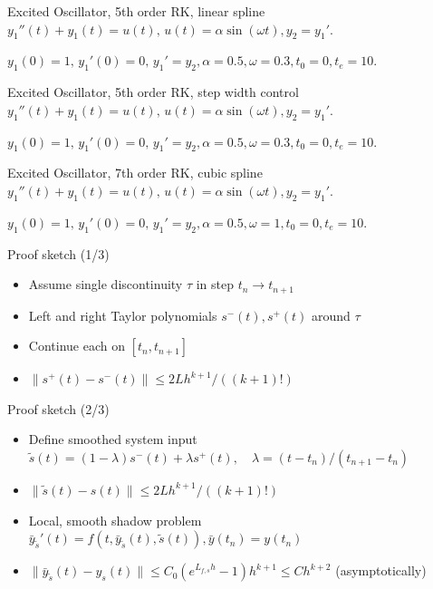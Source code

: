 \documentclass{beamer}
\newcommand{\nologo}{\setbeamertemplate{logo}{}}
\begin{document}
\begin{frame}{Excited Oscillator, 5th order RK, linear spline}
  $y_{1}''(t) + y_{1}(t) = u(t),\, u(t) = \alpha\sin(\omega t), y_{2} = y_{1}'$.
  
  $y_{1}(0) = 1,\, y_{1}'(0) = 0,\, y_{1}' = y_{2}, \alpha = 0.5, \omega = 0.3, t_{0} = 0, t_{e} = 10$.
\end{frame}

\begin{frame}{Excited Oscillator, 5th order RK, step width control}
  $y_{1}''(t) + y_{1}(t) = u(t),\, u(t) = \alpha\sin(\omega t), y_{2} = y_{1}'$.
  
  $y_{1}(0) = 1,\, y_{1}'(0) = 0,\, y_{1}' = y_{2}, \alpha = 0.5, \omega = 0.3, t_{0} = 0, t_{e} = 10$.
\end{frame}

\begin{frame}{Excited Oscillator, 7th order RK, cubic spline}
  $y_{1}''(t) + y_{1}(t) = u(t),\, u(t) = \alpha\sin(\omega t), y_{2} = y_{1}'$.
  
  $y_{1}(0) = 1,\, y_{1}'(0) = 0,\, y_{1}' = y_{2}, \alpha = 0.5, \omega = 1, t_{0} = 0, t_{e} = 10$.
\end{frame}

\begin{frame}{Proof sketch (1/3)}
  
  \begin{itemize}
    \item<1-> Assume single discontinuity $\tau$ in step $t_{n} \to t_{n+1}$
    \item<2-> Left and right Taylor polynomials $s^{-}(t), s^{+}(t)$ around $\tau$
    \item<3-> Continue each on $[t_{n}, t_{n+1}]$
    \item<4-> $\lVert s^{+}(t) - s^{-}(t) \rVert \leq 2Lh^{k+1} / ((k+1)!)$
  \end{itemize}
\end{frame}

{
  \nologo
  \begin{frame}{Proof sketch (2/3)}
    
    \begin{itemize}
    \item<1-> Define smoothed system input $\tilde{s}(t) = (1-\lambda)s^{-}(t) + \lambda s^{+}(t), \quad \lambda = (t-t_{n}) / (t_{n+1} - t_{n})$
    \item<2-> $\lVert \tilde{s}(t) - s(t) \rVert \leq 2Lh^{k+1} / ((k+1)!) $
    \item<3-> Local, smooth shadow problem $\bar{y}_{\tilde{s}}'(t) = f(t, \bar{y}_{\tilde{s}}(t), \tilde{s}(t)), \bar{y}(t_{n}) = y(t_{n})$
    \item<4-> $\lVert \bar{y}_{\tilde{s}}(t) - y_{s}(t) \rVert \leq C_{0} (e^{L_{f, s}h} - 1)h^{k+1} \leq Ch^{k+2}$ (asymptotically)
  \end{itemize}
\end{frame}
}
\end{document}

